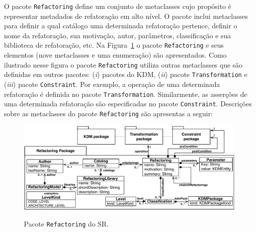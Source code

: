 O pacote \texttt{Refactoring} define um conjunto de metaclasses cujo propósito é representar metadados de refatoração em alto nível. O pacote inclui metaclasses para definir a qual catálogo uma determinada refatoração pertence, definir o nome da refatoração, sua motivação, autor, parâmetros, classificação e sua biblioteca de refatoração, etc. Na Figura~\ref{fig:pacote_refactoring_srm} o pacote \texttt{Refactoring} e seus elementos (nove metaclasses e uma enumeração) são apresentados. Como ilustrado nesse figura o pacote \texttt{Refactoring} utiliza outras metaclasses que são definidas em outros pacotes: (\textit{i}) pacotes do KDM, (\textit{ii}) pacote \texttt{Transformation} e (\textit{iii}) pacote \texttt{Constraint}. Por exemplo, a operação de uma determinada refatoração é definida no pacote \texttt{Transformation}. Similarmente, as asserções de uma determinada refatoração são especificadas no pacote \texttt{Constraint}. Descrições sobre as metaclasses do pacote \texttt{Refactoring} são apresentas a seguir: 

\begin{figure}[h]
	\centering
		\caption{Pacote \texttt{Refactoring} do SR.}
	\includegraphics[scale=0.70]{images/pacoteRefactoring2}
	\label{fig:pacote_refactoring_srm}
	\fautor
\end{figure}

